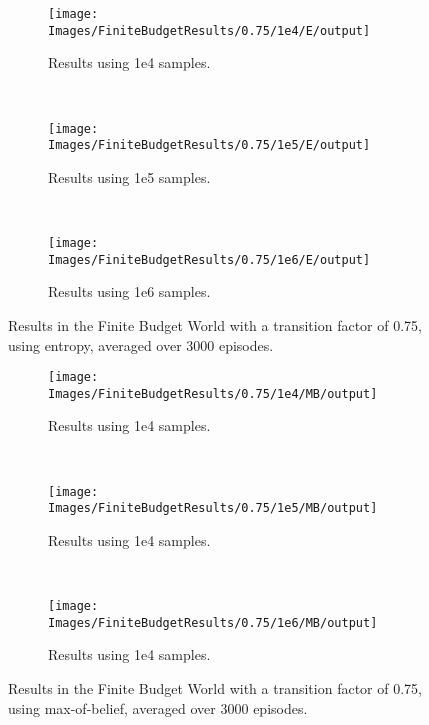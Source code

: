 \begin{figure}[ht]
        \centering
        \begin{subfigure}[t]{0.3\textwidth}
                \texttt{[image: Images/FiniteBudgetResults/0.75/1e4/E/output]}
                \caption{Results using 1e4 samples.}
                \label{fig:fb4e75}
        \end{subfigure}%
        ~ %
        \begin{subfigure}[t]{0.3\textwidth}
                \texttt{[image: Images/FiniteBudgetResults/0.75/1e5/E/output]}
                \caption{Results using 1e5 samples.}
                \label{fig:fb5e75}
        \end{subfigure}
        ~ %
        \begin{subfigure}[t]{0.3\textwidth}
                \texttt{[image: Images/FiniteBudgetResults/0.75/1e6/E/output]}
                \caption{Results using 1e6 samples.}
                \label{fig:fb6e75}
        \end{subfigure}
        \caption{Results in the Finite Budget World with a transition factor of 0.75, using entropy, averaged over 3000 episodes.}
        \label{ref:fbentropyfig75}
\end{figure}

\begin{figure}[ht]
        \centering
        \begin{subfigure}[t]{0.3\textwidth}
                \texttt{[image: Images/FiniteBudgetResults/0.75/1e4/MB/output]}
                \caption{Results using 1e4 samples.}
                \label{fig:fb4m75}
        \end{subfigure}%
        ~ %
        \begin{subfigure}[t]{0.3\textwidth}
                \texttt{[image: Images/FiniteBudgetResults/0.75/1e5/MB/output]}
                \caption{Results using 1e4 samples.}
                \label{fig:fb5m75}
        \end{subfigure}
        ~ %
        \begin{subfigure}[t]{0.3\textwidth}
                \texttt{[image: Images/FiniteBudgetResults/0.75/1e6/MB/output]}
                \caption{Results using 1e4 samples.}
                \label{fig:fb6m75}
        \end{subfigure}
        \caption{Results in the Finite Budget World with a transition factor of 0.75, using max-of-belief, averaged over 3000 episodes.}
        \label{ref:fbmbfig75}
\end{figure}


